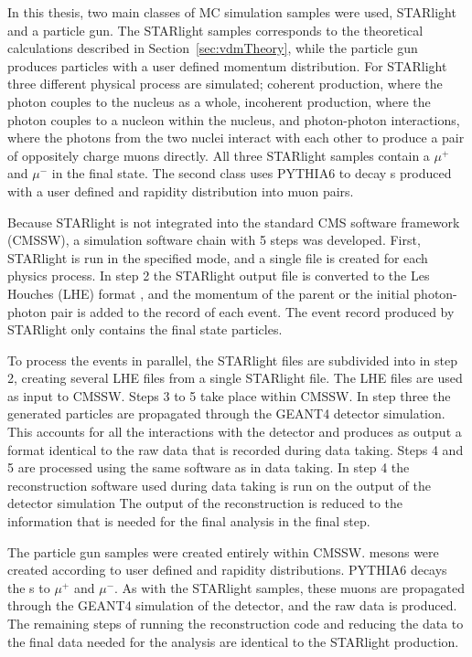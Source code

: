     In this thesis, two main classes of MC simulation samples were used, 
      STARlight and a particle gun.
    The STARlight samples corresponds to the theoretical calculations 
      described in Section~\ref{sec:vdmTheory}, while the particle gun produces
      particles with a user defined momentum distribution. 
    For STARlight three different physical process are simulated;
      coherent \JPsi{} production, where the photon couples to the nucleus as
      a whole, incoherent \JPsi{} production, where the photon couples to a
      nucleon within the nucleus, and photon-photon interactions, where the 
      photons from the two nuclei interact with each other to produce a pair 
      of oppositely charge muons directly.
    All three STARlight samples contain a $\mu^{+}$ and $\mu^{-}$ in the final 
      state.
    The second class uses PYTHIA6 to decay \JPsi{}s produced with a user 
      defined \pt{} and rapidity distribution into muon pairs.

    Because STARlight is not integrated into the standard CMS software 
      framework (CMSSW), a simulation software chain with 5 steps was developed.
    First, STARlight is run in the specified mode, and a single file is 
      created for each physics process. 
    In step 2 the STARlight output file is converted to the Les Houches (LHE) 
      format \cite{lheFormat}, and the momentum of the parent \JPsi{} or the 
      initial photon-photon pair is added to the record of each event.
    The event record produced by STARlight only contains the final state 
      particles.

    To process the events in parallel, the STARlight files are subdivided 
      into in step 2, creating several LHE files from a single STARlight file.
    The LHE files are used as input to CMSSW.
    Steps 3 to 5 take place within CMSSW. 
    In step three the generated particles are propagated through the GEANT4 
      \cite{geant} detector simulation.
    This accounts for all the interactions with the detector and produces as 
      output a format identical to the raw data that is recorded during data
      taking.
    Steps 4 and 5 are processed using the same software as in data taking.
    In step 4 the reconstruction software used during data taking is run on 
      the output of the detector simulation
    The output of the reconstruction is reduced to the information that is 
      needed for the final analysis in the final step.

    The particle gun samples were created entirely within CMSSW.
    \JPsi{} mesons were created according to user defined \pt{} and rapidity
      distributions. 
    PYTHIA6 \cite{pythia} decays the \JPsi{}s to $\mu^{+}$ and $\mu^{-}$.
    As with the STARlight samples, these muons are propagated through the GEANT4
      simulation of the detector, and the raw data is produced.
    The remaining steps of running the reconstruction code and reducing the 
      data to the final data needed for the analysis are identical to the 
      STARlight production.

